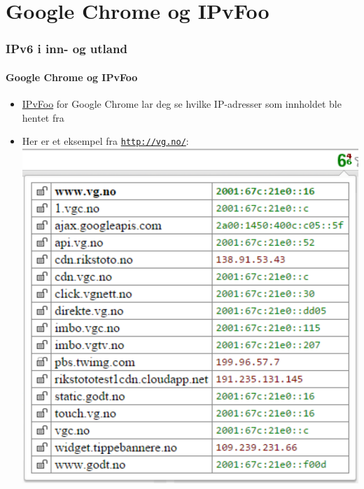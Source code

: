 \section{Google Chrome og IPvFoo}
\begin{frame}
  \frametitle{IPv6 i inn- og utland}
  \framesubtitle{Google Chrome og IPvFoo}
  \begin{itemize}
  \item \href{https://code.google.com/p/ipvfoo/}{IPvFoo} for Google
    Chrome lar deg se hvilke IP-adresser som innholdet ble hentet fra
  \item Her er et eksempel fra \texttt{\url{http://vg.no/}}:\\
  \includegraphics[scale=.4]{vg-dot-no-og-IPvFoo-i-Google-Chrome.pdf}
  \end{itemize}
\end{frame}

